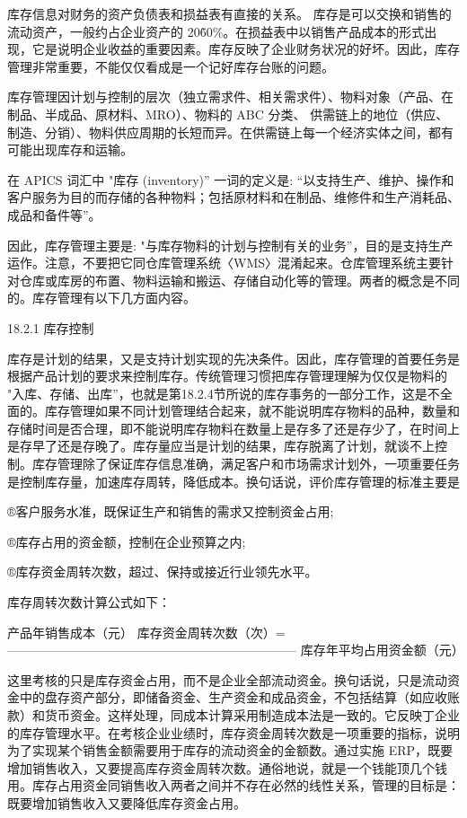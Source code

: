     库存信息对财务的资产负债表和损益表有直接的关系。 库存是可以交换和销售的流动资产，一般约占企业资产的 20\~60\%。在损益表中以销售产品成本的形式出现，它是说明企业收益的重要因素。库存反映了企业财务状况的好坏。因此，库存管理非常重要，不能仅仅看成是一个记好库存台账的问题。

    库存管理因计划与控制的层次（独立需求件、相关需求件）、物料对象（产品、在制品、半成品、原材料、MRO）、物料的 ABC 分类、 供需链上的地位（供应、制造、分销）、物料供应周期的长短而异。在供需链上每一个经济实体之间，都有可能出现库存和运输。

    在 APICS 词汇中 "库存 (inventory)” 一词的定义是: “以支持生产、维护、操作和客户服务为目的而存储的各种物料；包括原材料和在制品、维修件和生产消耗品、成品和备件等”。

    因此，库存管理主要是: "与库存物料的计划与控制有关的业务”，目的是支持生产运作。注意，不要把它同仓库管理系统〈WMS〉混淆起来。仓库管理系统主要针对仓库或库房的布置、物料运输和搬运、存储自动化等的管理。两者的概念是不同的。库存管理有以下几方面内容。

18.2.1 库存控制

    库存是计划的结果，又是支持计划实现的先决条件。因此，库存管理的首要任务是根据产品计划的要求来控制库存。传统管理习惯把库存管理理解为仅仅是物料的 "入库、存储、出库”，也就是第18.2.4节所说的库存事务的一部分工作，这是不全面的。库存管理如果不同计划管理结合起来，就不能说明库存物料的品种，数量和存储时间是否合理，即不能说明库存物料在数量上是存多了还是存少了，在时间上是存早了还是存晚了。库存量应当是计划的结果，库存脱离了计划，就谈不上控制。库存管理除了保证库存信息准确，满足客户和市场需求计划外，一项重要任务是控制库存量，加速库存周转，降低成本。换句话说，评价库存管理的标准主要是

    ®客户服务水准，既保证生产和销售的需求又控制资金占用;

    ®库存占用的资金额，控制在企业预算之内;

    ®库存资金周转次数，超过、保持或接近行业领先水平。

    库存周转次数计算公式如下：

                          产品年销售成本（元）
    库存资金周转次数（次）= ———————————————————————
                          库存年平均占用资金额（元）

    这里考核的只是库存资金占用，而不是企业全部流动资金。换句话说，只是流动资金中的盘存资产部分，即储备资金、生产资金和成品资金，不包括结算（如应收账款）和货币资金。这样处理，同成本计算采用制造成本法是一致的。它反映丁企业的库存管理水平。在考核企业业绩时，库存资金周转次数是一项重要的指标，说明为了实现某个销售金额需要用于库存的流动资金的金额数。通过实施 ERP，既要增加销售收入，又要提高库存资金周转次数。通俗地说，就是一个钱能顶几个钱用。库存占用资金同销售收入两者之间并不存在必然的线性关系，管理的目标是：既要增加销售收入又要降低库存资金占用。

